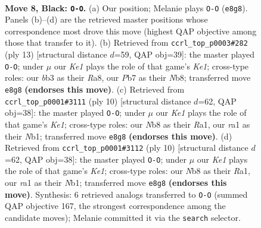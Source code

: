 \documentclass[11pt]{article}
\begin{document}
\begin{figure}[p]\centering
\begin{subfigure}{0.46\textwidth}\centering
\resizebox{\linewidth}{!}{%
\newchessgame
\chessboard[
  setfen={rnbqk2r/ppp1ppbp/1n4p1/4P3/7P/1B3N2/PPP2PP1/RNBQK2R b KQkq - 0 8},
  showmover=false,
  pgfstyle=straightmove, color=movearrow, markmove={e8-g8}
]}
\caption{}
\end{subfigure}\hfill
\begin{subfigure}{0.46\textwidth}\centering
\resizebox{\linewidth}{!}{%
\newchessgame
\chessboard[
  setfen={rnbqk2r/ppp1ppbp/1n4p1/8/N2PP3/5N2/PP3PPP/R1BQKB1R b KQkq - 0 7},
  showmover=false,
  pgfstyle=straightmove, color=movearrow, markmove={e8-g8}
]}
\caption{}
\end{subfigure}
\\[4pt]
\begin{subfigure}{0.46\textwidth}\centering
\resizebox{\linewidth}{!}{%
\newchessgame
\chessboard[
  setfen={rnbqkb1r/pp3ppp/4pn2/3p4/2Pp4/5NP1/PP2PPBP/RNBQK2R w KQkq - 0 6},
  showmover=false,
  pgfstyle=straightmove, color=movearrow, markmove={e1-g1}
]}
\caption{}
\end{subfigure}\hfill
\begin{subfigure}{0.46\textwidth}\centering
\resizebox{\linewidth}{!}{%
\newchessgame
\chessboard[
  setfen={rnbqkb1r/pp3ppp/4pn2/3p4/2Pp4/5NP1/PP2PPBP/RNBQK2R w KQkq - 0 6},
  showmover=false,
  pgfstyle=straightmove, color=movearrow, markmove={e1-g1}
]}
\caption{}
\end{subfigure}
\caption{\textbf{Move 8, Black: \texttt{O-O}.} (a) Our position; Melanie plays \texttt{O-O} (\texttt{e8g8}). Panels (b)--(d) are the retrieved master positions whose correspondence most drove this move (highest QAP objective among those that transfer to it). (b) Retrieved from \texttt{ccrl\_top\_p0003\#282} (ply 13) [structural distance $d$=59, QAP obj=39]: the master played \texttt{O-O}; under $\mu$ our \emph{Ke1} plays the role of that game's \emph{Ke1}; cross-type roles: our \emph{b}b3 as their \emph{R}a8, our \emph{P}b7 as their \emph{N}b8; transferred move \texttt{e8g8} \textbf{(endorses this move)}. (c) Retrieved from \texttt{ccrl\_top\_p0001\#3111} (ply 10) [structural distance $d$=62, QAP obj=38]: the master played \texttt{O-O}; under $\mu$ our \emph{Ke1} plays the role of that game's \emph{Ke1}; cross-type roles: our \emph{N}b8 as their \emph{R}a1, our \emph{r}a1 as their \emph{N}b1; transferred move \texttt{e8g8} \textbf{(endorses this move)}. (d) Retrieved from \texttt{ccrl\_top\_p0001\#3112} (ply 10) [structural distance $d$=62, QAP obj=38]: the master played \texttt{O-O}; under $\mu$ our \emph{Ke1} plays the role of that game's \emph{Ke1}; cross-type roles: our \emph{N}b8 as their \emph{R}a1, our \emph{r}a1 as their \emph{N}b1; transferred move \texttt{e8g8} \textbf{(endorses this move)}. Synthesis: 6 retrieved analogs transferred to \texttt{O-O} (summed QAP objective 167, the strongest correspondence among the candidate moves); Melanie committed it via the \texttt{search} selector.}
\label{fig:thought-m15}
\end{figure}
\end{document}
